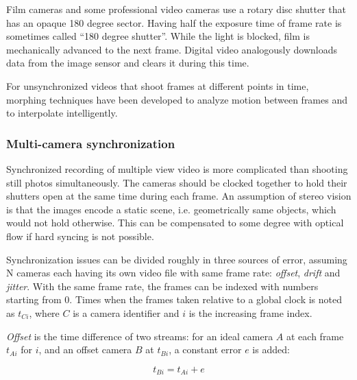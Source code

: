Film cameras and some professional video cameras use a rotary disc shutter that has an opaque 180 degree sector.
Having half the exposure time of frame rate is sometimes called ``180 degree shutter''.
While the light is blocked, film is mechanically advanced to the next frame.
Digital video analogously downloads data from the image sensor and clears it during this time.

For unsynchronized videos that shoot frames at different points in time, morphing techniques have been developed to analyze motion between frames and to interpolate intelligently.



\subsubsection{Multi-camera synchronization} %


Synchronized recording of multiple view video is more complicated than shooting still photos simultaneously.
The cameras should be clocked together to hold their shutters open at the same time during each frame.
An assumption of stereo vision is that the images encode a static scene, i.e. geometrically same objects, which would not hold otherwise.
This can be compensated to some degree with optical flow if hard syncing is not possible. \cite{bradley2009synchronization}

Synchronization issues can be divided roughly in three sources of error, assuming N cameras each having its own video file with same frame rate: \emph{offset}, \emph{drift} and \emph{jitter}.
With the same frame rate, the frames can be indexed with numbers starting from 0.
Times when the frames taken relative to a global clock is noted as $t_{Ci}$, where $C$ is a camera identifier and $i$ is the increasing frame index.

\emph{Offset} is the time difference of two streams: for an ideal camera $A$ at each frame $t_{Ai}$ for $i$, and an offset camera $B$ at $t_{Bi}$, a constant error $e$ is added:

\begin{equation} \label{eq:timeoffset}
	t_{Bi} = t_{Ai} + e
\end{equation}

